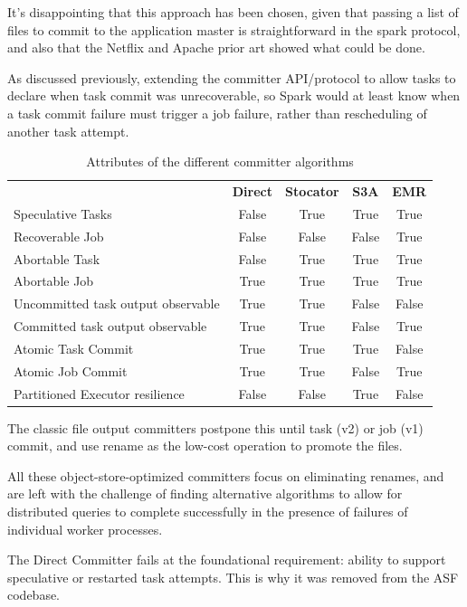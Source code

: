 \documentclass[conference]{IEEEtran}
\begin{document}
It's disappointing that this approach has been chosen, given that passing a
list of files to commit to the application master is straightforward in the
spark protocol, and also that the Netflix and Apache prior art showed what
could be done.

As discussed previously, extending the committer API/protocol to allow tasks
to declare when task commit was unrecoverable, so Spark would at least
know when a task commit failure must trigger a job failure, rather than
rescheduling of another task attempt.


\begin{table}
  \begin{tabular}{ l c c c c }
    \hline
    & \textbf{Direct} & \textbf{Stocator} & \textbf{S3A} & \textbf{EMR}\\
    Speculative Tasks & False & True & True & True \\
    Recoverable Job   & False & False & False & True \\
    Abortable Task    & False & True & True & True \\
    Abortable Job     & True & True & True & True \\
    Uncommitted task output observable & True & True & False & False \\
    Committed task output observable & True & True & False & True\\
    Atomic Task Commit & True & True & True & False \\
    Atomic Job Commit & True & True & False & True \\
    Partitioned Executor resilience & False & False & True & False\\
    \hline
  \end{tabular}
\caption{Attributes of the different committer algorithms}
\label{tab:other-committer-attributes}
\end{table}


The classic file output committers postpone this until task (v2) or job (v1)
commit, and use rename as the low-cost operation to promote the files.

All these object-store-optimized committers focus on eliminating renames,
and are left with the challenge of finding alternative algorithms to
allow for distributed queries to complete successfully in the presence
of failures of individual worker processes.


The Direct Committer fails at the foundational requirement: ability to support
speculative or restarted task attempts.
This is why it was removed from the ASF codebase.
\end{document}
